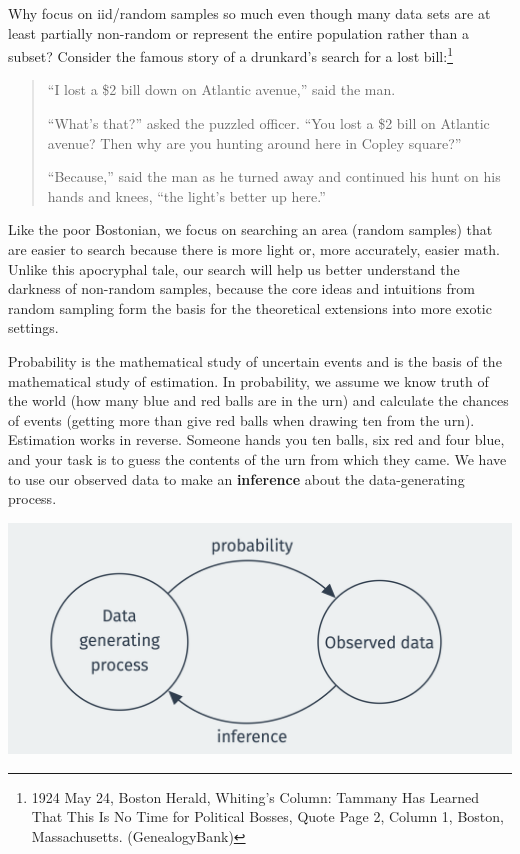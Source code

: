 \documentclass[
  letterpaper,
  DIV=11,
  numbers=noendperiod]{scrreprt}
\theoremstyle{definition}
\theoremstyle{definition}
\theoremstyle{plain}
\theoremstyle{remark}
\begin{document}
Why focus on iid/random samples so much even though many data sets are
at least partially non-random or represent the entire population rather
than a subset? Consider the famous story of a drunkard's search for a
lost bill:\footnote{1924 May 24, Boston Herald, Whiting's Column:
  Tammany Has Learned That This Is No Time for Political Bosses, Quote
  Page 2, Column 1, Boston, Massachusetts. (GenealogyBank)}

\begin{quote}
``I lost a \$2 bill down on Atlantic avenue,'' said the man.

``What's that?'' asked the puzzled officer. ``You lost a \$2 bill on
Atlantic avenue? Then why are you hunting around here in Copley
square?''

``Because,'' said the man as he turned away and continued his hunt on
his hands and knees, ``the light's better up here.''
\end{quote}

Like the poor Bostonian, we focus on searching an area (random samples)
that are easier to search because there is more light or, more
accurately, easier math. Unlike this apocryphal tale, our search will
help us better understand the darkness of non-random samples, because
the core ideas and intuitions from random sampling form the basis for
the theoretical extensions into more exotic settings.

Probability is the mathematical study of uncertain events and is the
basis of the mathematical study of estimation. In probability, we assume
we know truth of the world (how many blue and red balls are in the urn)
and calculate the chances of events (getting more than give red balls
when drawing ten from the urn). Estimation works in reverse. Someone
hands you ten balls, six red and four blue, and your task is to guess
the contents of the urn from which they came. We have to use our
observed data to make an \textbf{inference} about the data-generating
process.

\includegraphics{assets/img/two-direction.png}
\end{document}
